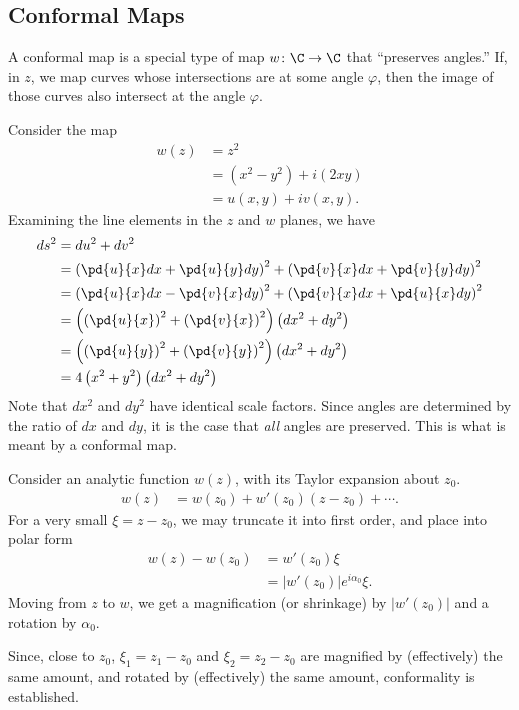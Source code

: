 \documentclass[10pt]{mypackage}
\begin{document}
\subsection{Conformal Maps}%
A conformal map is a special type of map $w\colon \C\rightarrow \C$ that ``preserves angles.'' If, in $z$, we map curves whose intersections are at some angle $\varphi$, then the image of those curves also intersect at the angle $\varphi$.
\begin{example}
  Consider the map
  \begin{align*}
    w(z) &= z^2\\
         &= \left( x^2 - y^2 \right) + i\left( 2xy \right)\\
         &= u\left( x,y \right) + iv\left( x,y \right).
  \end{align*}
  Examining the line elements in the $z$ and $w$ planes, we have
  \begin{align*}
    ds^2 &= du^2 + dv^2\\
         &= \left( \pd{u}{x}dx + \pd{u}{y}dy \right)^2 + \left( \pd{v}{x}dx + \pd{v}{y}dy \right)^2\\
         &= \left( \pd{u}{x}dx - \pd{v}{x}dy \right)^2 + \left( \pd{v}{x}dx + \pd{u}{x}dy \right)^2\\
         &= \left( \left( \pd{u}{x} \right)^2 + \left( \pd{v}{x} \right)^2 \right) \left( dx^2 + dy^2 \right)\\
         &= \left( \left( \pd{u}{y} \right)^2 + \left( \pd{v}{y} \right)^2 \right) \left( dx^2 + dy^2 \right)\\
         &= 4\left( x^2 + y^2 \right)\left( dx^2 + dy^2 \right)
  \end{align*}
  Note that $dx^2$ and $dy^2$ have identical scale factors. Since angles are determined by the ratio of $dx$ and $dy$, it is the case that \textit{all} angles are preserved. This is what is meant by a conformal map.
\end{example}
\begin{example}
Consider an analytic function $w(z)$, with its Taylor expansion about $z_0$.
\begin{align*}
  w(z) &= w\left( z_0 \right) + w'\left( z_0 \right)\left( z-z_0 \right) + \cdots.
\end{align*}
For a very small $\xi = z-z_0$, we may truncate it into first order, and place into polar form
\begin{align*}
  w(z) - w\left(z_0\right) &= w'\left(z_0\right)\xi\\
                           &= \left\vert w'\left( z_0 \right) \right\vert e^{i\alpha_0}\xi.
\end{align*}
Moving from $z$ to $w$, we get a magnification (or shrinkage) by $\left\vert w'\left( z_0 \right) \right\vert$ and a rotation by $\alpha_0$.\newline

Since, close to $z_0$, $\xi_1 = z_1 - z_0$ and $\xi_2 = z_2 - z_0$ are magnified by (effectively) the same amount, and rotated by (effectively) the same amount, conformality is established.
\end{example}
\end{document}
